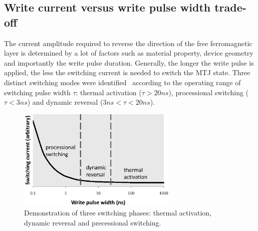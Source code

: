 \subsection{Write current versus write pulse width trade-off}
The current amplitude required to reverse the direction of the free ferromagnetic layer is determined by a lot of factors such as material property, device geometry and importantly the write pulse duration. Generally, the longer the write pulse is applied, the less the switching current is needed to switch the MTJ state. Three distinct switching modes were identified~\cite{STTRAM:JAP07} according to the operating range of switching pulse width $\tau$: thermal activation ($\tau>20ns$), processional switching ($\tau<3ns$) and dynamic reversal ($3ns<\tau<20ns$). 

\begin{figure}[t]
  \centering
  \includegraphics[width=3in]{fig/IcWt.eps}
  \caption{Demonstration of three switching phases: thermal activation, dynamic reversal and precessional switching.}
  \label{fig:IcWt}
\end{figure}


